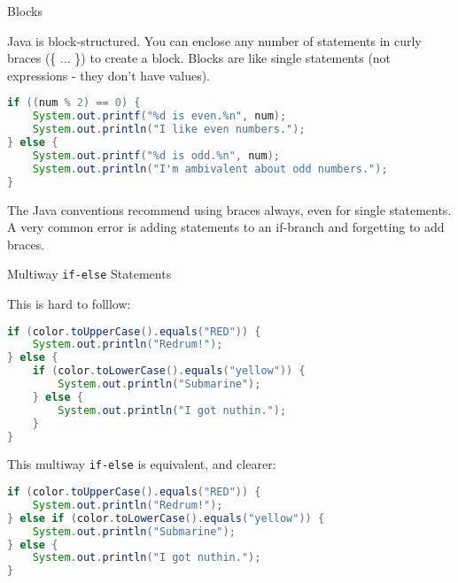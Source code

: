 \documentclass{beamer}
\begin{document}
\begin{frame}[fragile]{Blocks}


Java is block-structured.  You can enclose any number
of statements in curly braces (\{ ... \}) to create a block.  Blocks
are like single statements (not expressions - they don't have values).
\begin{lstlisting}[language=Java]
if ((num % 2) == 0) {
    System.out.printf("%d is even.%n", num);
    System.out.println("I like even numbers.");
} else {
    System.out.printf("%d is odd.%n", num);
    System.out.println("I'm ambivalent about odd numbers.");
}
\end{lstlisting}
The Java conventions recommend using braces always, even for single
statements.  A very common error is adding statements to an if-branch
and forgetting to add braces.

\end{frame}

\begin{frame}[fragile]{Multiway {\tt if-else} Statements}


This is hard to folllow:
\begin{lstlisting}[language=Java]
if (color.toUpperCase().equals("RED")) {
    System.out.println("Redrum!");
} else {
    if (color.toLowerCase().equals("yellow")) {
        System.out.println("Submarine");
    } else {
        System.out.println("I got nuthin.");
    }
}
\end{lstlisting}
\vspace{-.05in}
This multiway {\tt if-else} is equivalent, and clearer:
\vspace{-.05in}
\begin{lstlisting}[language=Java]
if (color.toUpperCase().equals("RED")) {
    System.out.println("Redrum!");
} else if (color.toLowerCase().equals("yellow")) {
    System.out.println("Submarine");
} else {
    System.out.println("I got nuthin.");
}
\end{lstlisting}

\end{frame}
\end{document}

